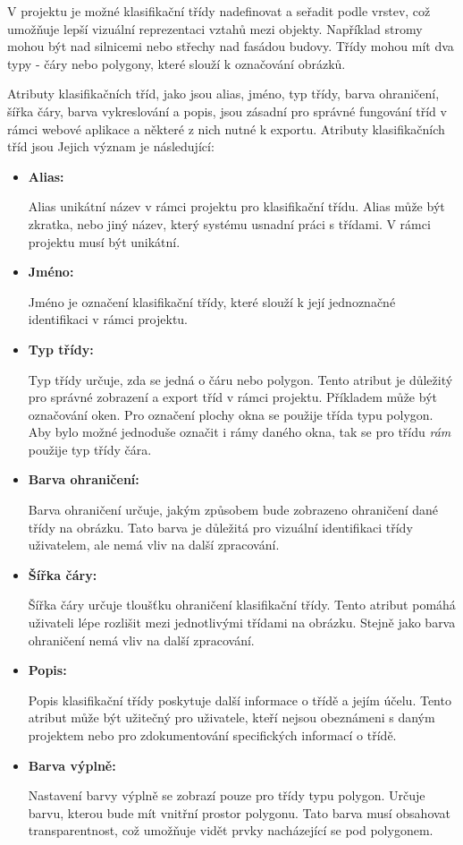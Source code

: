 V projektu je možné klasifikační třídy nadefinovat a seřadit podle vrstev, což umožňuje lepší vizuální reprezentaci vztahů mezi objekty. Například stromy mohou být nad silnicemi nebo střechy nad fasádou budovy. Třídy mohou mít dva typy - čáry nebo polygony, které slouží k označování obrázků.

Atributy klasifikačních tříd, jako jsou alias, jméno, typ třídy, barva ohraničení, šířka čáry, barva vykreslování a popis, jsou zásadní pro správné fungování tříd v rámci webové aplikace a některé z nich nutné k exportu. Atributy klasifikačních tříd jsou Jejich význam je následující:

\begin{itemize}
\item \textbf{Alias:}

Alias unikátní název v rámci projektu pro klasifikační třídu. Alias může být zkratka, nebo jiný název, který systému usnadní práci s třídami. V rámci projektu musí být unikátní.

\item \textbf{Jméno:}

Jméno je označení klasifikační třídy, které slouží k její jednoznačné identifikaci v rámci projektu.

\item \textbf{Typ třídy:}

Typ třídy určuje, zda se jedná o čáru nebo polygon. Tento atribut je důležitý pro správné zobrazení a export tříd v rámci projektu. Příkladem může být označování oken. Pro označení plochy okna se použije třída typu polygon. Aby bylo možné jednoduše označit i rámy daného okna, tak se pro třídu \textit{rám} použije typ třídy čára.

\item \textbf{Barva ohraničení:}

Barva ohraničení určuje, jakým způsobem bude zobrazeno ohraničení dané třídy na obrázku. Tato barva je důležitá pro vizuální identifikaci třídy uživatelem, ale nemá vliv na další zpracování.

\item \textbf{Šířka čáry:}

Šířka čáry určuje tloušťku ohraničení klasifikační třídy. Tento atribut pomáhá uživateli lépe rozlišit mezi jednotlivými třídami na obrázku. Stejně jako barva ohraničení nemá vliv na další zpracování.

\item \textbf{Popis:}

Popis klasifikační třídy poskytuje další informace o třídě a jejím účelu. Tento atribut může být užitečný pro uživatele, kteří nejsou obeznámeni s daným projektem nebo pro zdokumentování specifických informací o třídě.

\item \textbf{Barva výplně:} 

Nastavení barvy výplně se zobrazí pouze pro třídy typu polygon. Určuje barvu, kterou bude mít vnitřní prostor polygonu. Tato barva musí obsahovat transparentnost, což umožňuje vidět prvky nacházející se pod polygonem.

\end{itemize}

